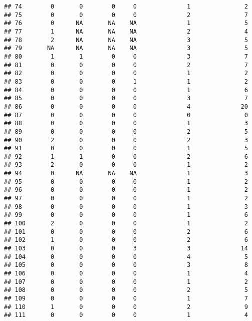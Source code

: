 \documentclass[
]{article}
\begin{document}
\begin{verbatim}
## 74        0       0        0     0              1               2
## 75        0       0        0     0              2               7
## 76        0      NA       NA    NA              1               5
## 77        1      NA       NA    NA              2               4
## 78        2      NA       NA    NA              3               5
## 79       NA      NA       NA    NA              3               5
## 80        1       1        0     0              3               7
## 81        0       0        0     0              2               7
## 82        0       0        0     0              1               2
## 83        0       0        0     1              1               2
## 84        0       0        0     0              1               6
## 85        0       0        0     0              3               7
## 86        0       0        0     0              4              20
## 87        0       0        0     0              0               0
## 88        0       0        0     0              1               3
## 89        0       0        0     0              2               5
## 90        2       0        0     0              2               3
## 91        0       0        0     0              1               5
## 92        1       1        0     0              2               6
## 93        2       0        0     0              1               2
## 94        0      NA       NA    NA              1               3
## 95        0       0        0     0              1               2
## 96        0       0        0     0              1               2
## 97        0       0        0     0              1               2
## 98        0       0        0     0              1               3
## 99        0       0        0     0              1               6
## 100       2       0        0     0              1               2
## 101       0       0        0     0              2               6
## 102       1       0        0     0              2               6
## 103       0       0        0     3              3              14
## 104       0       0        0     0              4               5
## 105       0       0        0     0              3               8
## 106       0       0        0     0              1               4
## 107       0       0        0     0              1               2
## 108       0       0        0     0              2               5
## 109       0       0        0     0              1               7
## 110       1       0        0     0              2               9
## 111       0       0        0     0              1               4

\end{verbatim}
\end{document}
